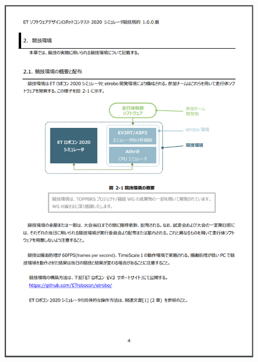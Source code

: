 \documentclass[uplatex, report, a4j, 10pt]{jsbook}
\begin{document}
\begin{figure}[tp]
    \begin{center}
    \includegraphics[width=\hsize]{specification/ET_1.eps}
    \end{center}
\end{figure}
\end{document}
